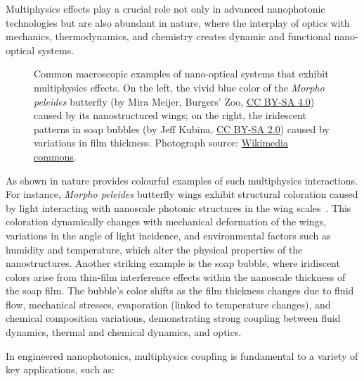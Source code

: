 Multiphysics effects play a crucial role not only in advanced nanophotonic technologies but are also abundant in nature, where the interplay of optics with mechanics, thermodynamics, and chemistry creates dynamic and functional nano-optical systems.

\begin{figure}[b!]
    \centering
    \caption{Common macroscopic examples of nano-optical systems that exhibit multiphysics effects. On the left, the vivid blue color of the \textit{Morpho peleides} butterfly (by Mira Meijer, Burgers' Zoo, \href{https://creativecommons.org/licenses/by-sa/4.0/}{CC BY-SA 4.0}) caused by its nanostructured wings; on the right, the iridescent patterns in soap bubbles (by Jeff Kubina, \href{https://creativecommons.org/licenses/by-sa/2.0/}{CC BY-SA 2.0}) caused by variations in film thickness. Photograph source: \href{https://commons.wikimedia.org/wiki/Main_Page}{Wikimedia commons}.}
    \label{fig:motivation_natural}
\end{figure}

As shown in  nature provides colourful examples of such multiphysics interactions. For instance, \textit{Morpho peleides} butterfly wings exhibit structural coloration caused by light interacting with nanoscale photonic structures in the wing scales~\cite{butterfly}. This coloration dynamically changes with mechanical deformation of the wings, variations in the angle of light incidence, and environmental factors such as humidity and temperature, which alter the physical properties of the nanostructures. 
Another striking example is the soap bubble, where iridiscent colors arise from thin-film interference effects within the nanoscale thickness of the soap film. The bubble's color shifts as the film thickness changes due to fluid flow, mechanical stresses, evaporation (linked to temperature changes), and chemical composition variations, demonstrating strong coupling between fluid dynamics, thermal and chemical dynamics, and optics.

In engineered nanophotonics, multiphysics coupling is fundamental to a variety of key applications, such as:

